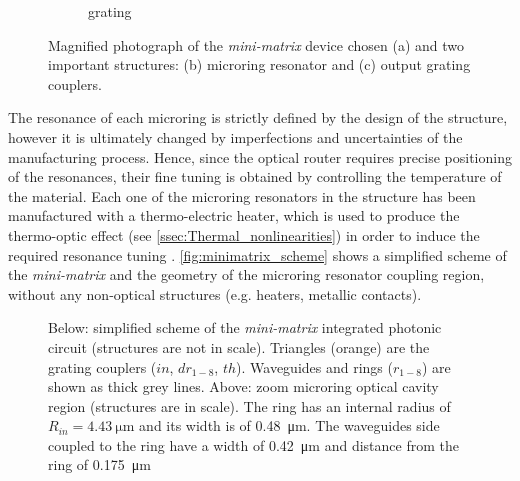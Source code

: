 \begin{figure}[htbp]
\begin{subfigure}[t]{0.345\textwidth}
		\caption{grating}
		\label{fig:photo_grating}
	\end{subfigure}
	\caption{Magnified photograph of the \textit{mini-matrix} device chosen (a) and two important structures: (b) microring resonator and (c) output grating couplers. }
	\label{fig:photos}
\end{figure}

The resonance of each microring is strictly defined by the design of the structure, however it is ultimately changed by imperfections and uncertainties of the manufacturing process.
Hence, since the optical router requires precise positioning of the resonances, their fine tuning is obtained by controlling the temperature of the material.
Each one of the microring resonators in the structure has been manufactured with a thermo-electric heater, which is used to produce the thermo-optic effect (see \autoref{ssec:Thermal_nonlinearities}) in order to induce the required resonance tuning \cite{testa2016design}.
\autoref{fig:minimatrix_scheme} shows a simplified scheme of the \textit{mini-matrix} and the geometry of the microring resonator coupling region, without any non-optical structures (e.g. heaters, metallic contacts).


\begin{figure}[hbtp]
	\centering
%	
	
	\caption{
		Below: simplified scheme of the \textit{mini-matrix} integrated photonic circuit
		(structures are not in scale).
		Triangles (orange) are the grating couplers ($in$, $dr_{1-8}$, $th$).
		Waveguides and rings ($r_{1-8}$) are shown as thick grey lines.
		Above: zoom microring optical cavity region (structures are in scale).
		The ring has an internal radius of $R_{in}=\SI{4.43}{\um}$
		and its width is of \SI{0.48}{\um}.
		The waveguides side coupled to the ring have a width of \SI{0.42}{\um}
		and distance from the ring of \SI{.175}{\um}
	}
	\label{fig:minimatrix_scheme}
\end{figure}

